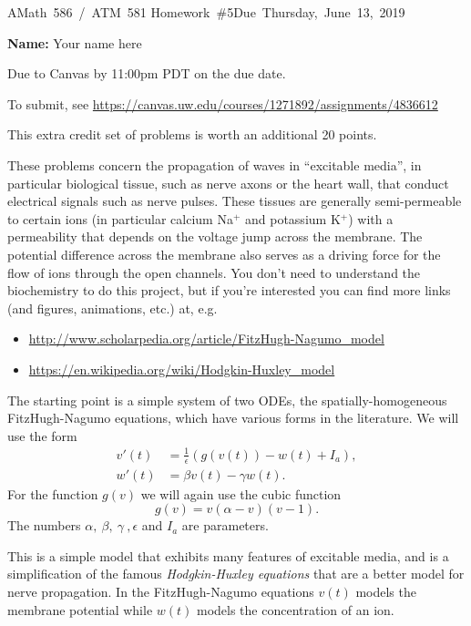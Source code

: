 \documentclass[10pt]{article}
\begin{document}
\hfill\vbox{\hbox{AMath 586 / ATM 581}
\hbox{Homework \#5}\hbox{Due Thursday, June 13, 2019}}

{\bf Name:} Your name here
\vskip 5pt

Due to Canvas by 11:00pm PDT on the due date.

To submit, see \url{https://canvas.uw.edu/courses/1271892/assignments/4836612}

This extra credit set of problems is worth an additional 20 points.


These problems concern the propagation of waves in ``excitable media'', in
particular biological tissue, such as nerve axons or the heart wall, that
conduct electrical signals such as nerve pulses.  These tissues are
generally semi-permeable to certain ions (in particular calcium Na$^+$ and
potassium K$^+$) with a permeability that depends on the voltage jump across
the membrane.  The potential difference across the membrane also serves as a
driving force for the flow of ions through the open channels.  You don't
need to understand the biochemistry to do this project, but if you're interested
you can find more links (and figures, animations, etc.) at, e.g.
\begin{itemize}
\item \url{http://www.scholarpedia.org/article/FitzHugh-Nagumo_model}
\item \url{https://en.wikipedia.org/wiki/Hodgkin-Huxley_model}
\end{itemize}

The starting point is a simple system of two ODEs, the spatially-homogeneous
FitzHugh-Nagumo
equations, which have various forms in the literature.  We will use the form
\begin{equation}\label{FHNode}
\begin{split}
v'(t) &= \frac 1 \epsilon (g(v(t)) - w(t) + I_a),\\
w'(t) &= \beta v(t) - \gamma w(t).
\end{split}
\end{equation} 
For the function $g(v)$ we will again use the cubic function
\begin{equation}\label{fv}
g(v) = v(\alpha - v)(v-1).
\end{equation} 
The  numbers $\alpha,~\beta,~\gamma~,\epsilon$ and $I_a$ are parameters.

This is a simple model that exhibits many features of excitable media, and
is a simplification of the famous {\it Hodgkin-Huxley equations} that are a 
better model for nerve propagation.  In the FitzHugh-Nagumo equations 
$v(t)$ models the membrane potential while $w(t)$ models the concentration
of an ion.
\end{document}
